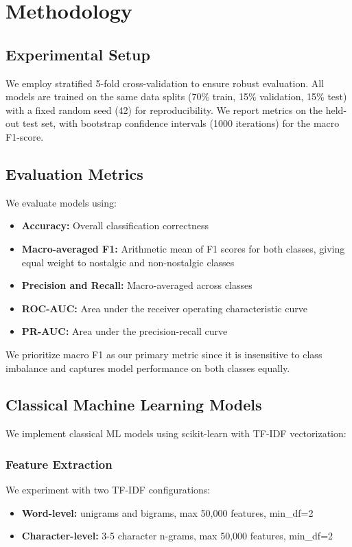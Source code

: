 \documentclass[conference]{IEEEtran}
\begin{document}
\section{Methodology}

\subsection{Experimental Setup}

We employ stratified 5-fold cross-validation to ensure robust evaluation. All models are trained on the same data splits (70\% train, 15\% validation, 15\% test) with a fixed random seed (42) for reproducibility. We report metrics on the held-out test set, with bootstrap confidence intervals (1000 iterations) for the macro F1-score.

\subsection{Evaluation Metrics}

We evaluate models using:
\begin{itemize}
\item \textbf{Accuracy:} Overall classification correctness
\item \textbf{Macro-averaged F1:} Arithmetic mean of F1 scores for both classes, giving equal weight to nostalgic and non-nostalgic classes
\item \textbf{Precision and Recall:} Macro-averaged across classes
\item \textbf{ROC-AUC:} Area under the receiver operating characteristic curve
\item \textbf{PR-AUC:} Area under the precision-recall curve
\end{itemize}

We prioritize macro F1 as our primary metric since it is insensitive to class imbalance and captures model performance on both classes equally.

\subsection{Classical Machine Learning Models}

We implement classical ML models using scikit-learn with TF-IDF vectorization:

\subsubsection{Feature Extraction}
We experiment with two TF-IDF configurations:
\begin{itemize}
\item \textbf{Word-level:} unigrams and bigrams, max 50,000 features, min\_df=2
\item \textbf{Character-level:} 3-5 character n-grams, max 50,000 features, min\_df=2
\end{itemize}
\end{document}
